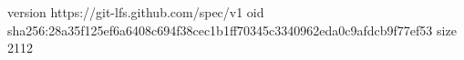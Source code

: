 version https://git-lfs.github.com/spec/v1
oid sha256:28a35f125ef6a6408c694f38cec1b1ff70345c3340962eda0c9afdcb9f77ef53
size 2112
